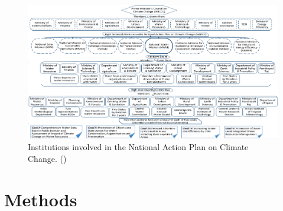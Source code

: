 \documentclass[12pt]{article}
\begin{document}
\begin{figure}[h]
  \centering
  \includegraphics[width = \textwidth]{NAPCC_india.jpg}
  \caption{Institutions involved in the National Action Plan on Climate Change. (\cite{azohani_2017})}
\end{figure}




\section*{Methods}
\end{document}
